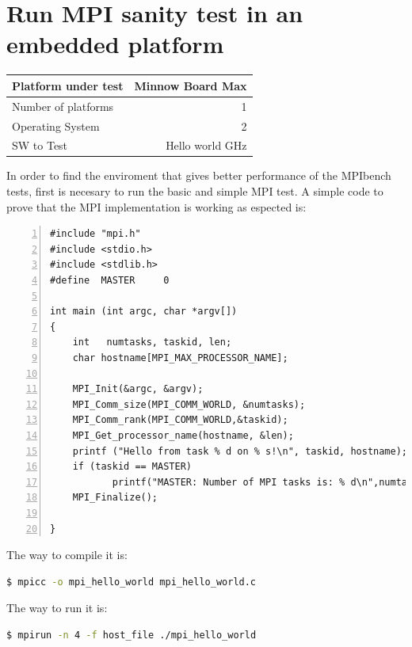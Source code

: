 \section{Run MPI sanity test in an embedded platform}


    \begin{center}
    \begin{tabular}{ | l | r |}
        \hline
        Platform under test & Minnow Board  Max \\ \hline
        Number of platforms  & 1  \\ \hline
        Operating System & 2  \\ \hline
        SW to Test & Hello world GHz  \\ \hline
    \end{tabular}
     \label{Sanity Sumary}
    \end{center}


In order to find the enviroment that gives better performance of the MPIbench
tests, first is necesary to run the basic and simple MPI test. A simple code to
prove that the MPI implementation is working as espected is:

\begin{lstlisting}[frame=single,numbers=left,breaklines=true,basicstyle=\tiny]
#include "mpi.h"
#include <stdio.h>
#include <stdlib.h>
#define  MASTER     0

int main (int argc, char *argv[])
{
    int   numtasks, taskid, len;
    char hostname[MPI_MAX_PROCESSOR_NAME];

    MPI_Init(&argc, &argv);
    MPI_Comm_size(MPI_COMM_WORLD, &numtasks);
    MPI_Comm_rank(MPI_COMM_WORLD,&taskid);
    MPI_Get_processor_name(hostname, &len);
    printf ("Hello from task % d on % s!\n", taskid, hostname);
    if (taskid == MASTER)
           printf("MASTER: Number of MPI tasks is: % d\n",numtasks);
    MPI_Finalize();

}
\end{lstlisting}

The way to compile it is: 

\begin{lstlisting}[frame=single,language=bash]
  $ mpicc -o mpi_hello_world mpi_hello_world.c
\end{lstlisting}


The way to run it is: 

\begin{lstlisting}[frame=single,language=bash]
  $ mpirun -n 4 -f host_file ./mpi_hello_world
\end{lstlisting}

